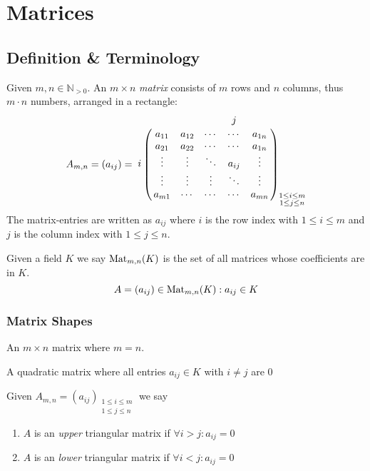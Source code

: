 \section{Matrices}
\subsection{Definition \& Terminology}
\begin{definition}[Matrix]
   Given \(m, n \in \mathbb{N}_{>0}\). An \(m \times n\) \emph{matrix} consists of \(m\) rows and \(n\) columns, thus \(m \cdot n\) numbers, arranged in a rectangle:
   \[
   A_{m,n} = (a_{ij}) =
   \bordermatrix{
      ~ & & & & j & \cr
        & a_{11} & a_{12} & \cdots & \cdots & a_{1n} \cr
        & a_{21} & a_{22} & \cdots & \cdots & a_{1n} \cr
      i & \vdots & \vdots & \ddots & a_{ij} & \vdots \cr
        & \vdots & \vdots & \vdots & \ddots & \vdots \cr
        & a_{m1} & \cdots & \cdots & \cdots & a_{mn} \cr
   }_{\substack{1 \leq i \leq m \\ 1 \leq j \leq n}}
   \]
   The matrix-entries are written as \(a_{ij}\) where \(i\) is the row index with \(1 \leq i \leq m\) and \(j\) is the column index with \(1 \leq j \leq n\).
\end{definition}
\begin{remark}[Notation]
   Given a field \(K\) we say \(\operatorname{Mat}_{m,n}(K)\) is the set of all matrices whose coefficients are in \(K\).
   \[A = (a_{ij}) \in \operatorname{Mat}_{m,n}(K): a_{ij} \in K\]
\end{remark}

\subsubsection{Matrix Shapes}
\begin{definition}
   An \(m \times n\) matrix where \(m = n\).
\end{definition}

\begin{definition}
   A quadratic matrix where all entries \(a_{ij} \in K\) with \(i \neq j\) are \(0\)
\end{definition}

\begin{definition}\label{def:triangular_matrix}
   Given \(A_{m,n} = (a_{ij})_{\substack{1 \leq i \leq m \\ 1 \leq j \leq n}}\) we say

   \begin{enumerate}[label=\roman*, align=Center]
      \item \(A\) is an \emph{upper} triangular matrix if \(\forall i > j: a_{ij} = 0\)
      \item \(A\) is an \emph{lower} triangular matrix if \(\forall i < j: a_{ij} = 0\)
   \end{enumerate}
\end{definition}

